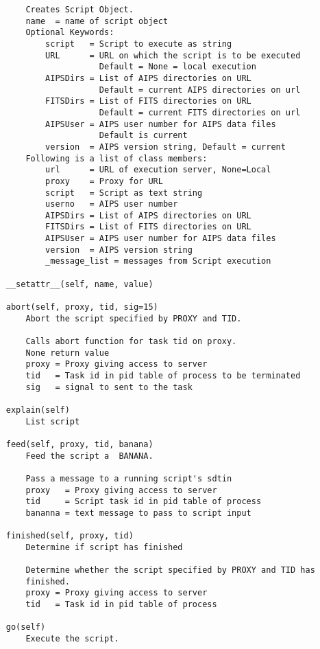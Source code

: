 \documentclass[11pt]{report}
\begin{document}
\begin{verbatim}
         Creates Script Object.
         name  = name of script object
         Optional Keywords:
             script   = Script to execute as string
             URL      = URL on which the script is to be executed
                        Default = None = local execution
             AIPSDirs = List of AIPS directories on URL
                        Default = current AIPS directories on url
             FITSDirs = List of FITS directories on URL
                        Default = current FITS directories on url
             AIPSUser = AIPS user number for AIPS data files
                        Default is current
             version  = AIPS version string, Default = current
         Following is a list of class members:
             url      = URL of execution server, None=Local
             proxy    = Proxy for URL
             script   = Script as text string
             userno   = AIPS user number
             AIPSDirs = List of AIPS directories on URL
             FITSDirs = List of FITS directories on URL
             AIPSUser = AIPS user number for AIPS data files
             version  = AIPS version string
             _message_list = messages from Script execution
     
     __setattr__(self, name, value)
     
     abort(self, proxy, tid, sig=15)
         Abort the script specified by PROXY and TID.
         
         Calls abort function for task tid on proxy.
         None return value
         proxy = Proxy giving access to server
         tid   = Task id in pid table of process to be terminated
         sig   = signal to sent to the task
     
     explain(self)
         List script
     
     feed(self, proxy, tid, banana)
         Feed the script a  BANANA.
         
         Pass a message to a running script's sdtin
         proxy   = Proxy giving access to server
         tid     = Script task id in pid table of process
         bananna = text message to pass to script input
     
     finished(self, proxy, tid)
         Determine if script has finished 
         
         Determine whether the script specified by PROXY and TID has
         finished.
         proxy = Proxy giving access to server
         tid   = Task id in pid table of process
     
     go(self)
         Execute the script.
         

\end{verbatim}
\end{document}
